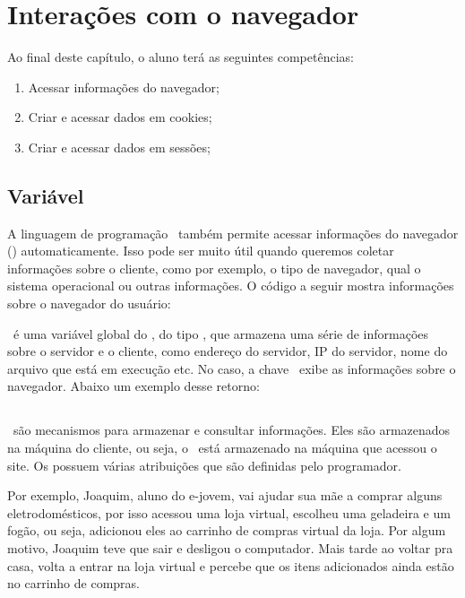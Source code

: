 \chapter{Interações com o navegador}
\label{interacoes-com-o-navegador}

Ao final deste capítulo, o aluno terá as seguintes competências:
\begin{enumerate}
    \item Acessar informações do navegador;
    \item Criar e acessar dados em cookies;
    \item Criar e acessar dados em sessões;
\end{enumerate}

\section{Variável \variavelserver}
\label{variavel-server}

A linguagem de programação \php~também permite acessar informações do navegador 
(\browser) automaticamente. Isso pode ser muito útil quando queremos coletar 
informações sobre o cliente, como por exemplo, o tipo de navegador, qual o 
sistema operacional ou outras informações. O código a seguir mostra informações 
sobre o navegador do usuário:



\variavelserver~é uma variável global do \php, do tipo \tipoarray, que armazena uma série 
de informações sobre o servidor e o cliente, como endereço do servidor, IP do servidor, 
nome do arquivo que está em execução etc. No caso, a chave \chavehttp~exibe as informações 
sobre o navegador. Abaixo um exemplo desse retorno:

\section{\titulocookies}
\label{cookies}

\cookies~são mecanismos para armazenar e consultar informações. Eles são armazenados na máquina 
do cliente, ou seja, o \cookie~está armazenado na máquina que acessou o site. Os \cookies possuem várias 
atribuições que são definidas pelo programador.

Por exemplo, Joaquim, aluno do e-jovem, vai ajudar sua mãe a comprar alguns eletrodomésticos, 
por isso acessou uma loja virtual, escolheu uma geladeira e um fogão, ou seja, adicionou eles ao 
carrinho de compras virtual da loja. Por algum motivo, Joaquim teve que sair e desligou o computador. 
Mais tarde ao voltar pra casa, volta a entrar na loja virtual e percebe que os itens adicionados 
ainda estão no carrinho de compras.

